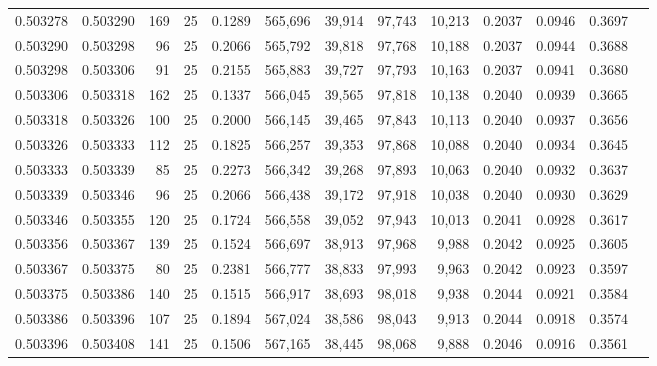\begin{tabular}{rrrrrrrrrrrrr}
0.503278 & 0.503290 & 169 &  25 &                                     0.1289 & 565,696 &  39,914 &  97,743 &  10,213 & 0.2037 & 0.0946 & 0.3697 \\
0.503290 & 0.503298 &  96 &  25 &                                     0.2066 & 565,792 &  39,818 &  97,768 &  10,188 & 0.2037 & 0.0944 & 0.3688 \\
0.503298 & 0.503306 &  91 &  25 &                                     0.2155 & 565,883 &  39,727 &  97,793 &  10,163 & 0.2037 & 0.0941 & 0.3680 \\
0.503306 & 0.503318 & 162 &  25 &                                     0.1337 & 566,045 &  39,565 &  97,818 &  10,138 & 0.2040 & 0.0939 & 0.3665 \\
0.503318 & 0.503326 & 100 &  25 &                                     0.2000 & 566,145 &  39,465 &  97,843 &  10,113 & 0.2040 & 0.0937 & 0.3656 \\
0.503326 & 0.503333 & 112 &  25 &                                     0.1825 & 566,257 &  39,353 &  97,868 &  10,088 & 0.2040 & 0.0934 & 0.3645 \\
0.503333 & 0.503339 &  85 &  25 &                                     0.2273 & 566,342 &  39,268 &  97,893 &  10,063 & 0.2040 & 0.0932 & 0.3637 \\
0.503339 & 0.503346 &  96 &  25 &                                     0.2066 & 566,438 &  39,172 &  97,918 &  10,038 & 0.2040 & 0.0930 & 0.3629 \\
0.503346 & 0.503355 & 120 &  25 &                                     0.1724 & 566,558 &  39,052 &  97,943 &  10,013 & 0.2041 & 0.0928 & 0.3617 \\
0.503356 & 0.503367 & 139 &  25 &                                     0.1524 & 566,697 &  38,913 &  97,968 &   9,988 & 0.2042 & 0.0925 & 0.3605 \\
0.503367 & 0.503375 &  80 &  25 &                                     0.2381 & 566,777 &  38,833 &  97,993 &   9,963 & 0.2042 & 0.0923 & 0.3597 \\
0.503375 & 0.503386 & 140 &  25 &                                     0.1515 & 566,917 &  38,693 &  98,018 &   9,938 & 0.2044 & 0.0921 & 0.3584 \\
0.503386 & 0.503396 & 107 &  25 &                                     0.1894 & 567,024 &  38,586 &  98,043 &   9,913 & 0.2044 & 0.0918 & 0.3574 \\
0.503396 & 0.503408 & 141 &  25 &                                     0.1506 & 567,165 &  38,445 &  98,068 &   9,888 & 0.2046 & 0.0916 & 0.3561 \\

\end{tabular}
